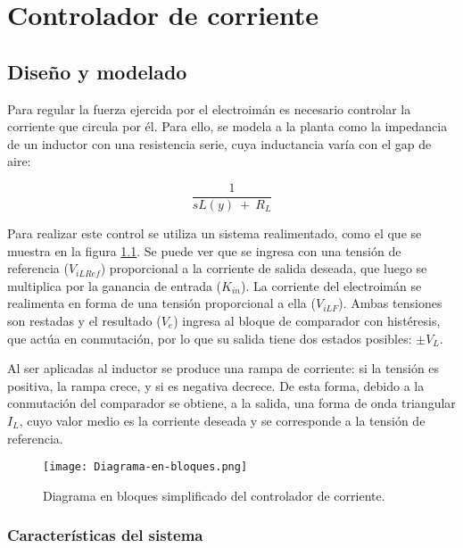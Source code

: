 \chapter{Controlador de corriente}  \label{cap:ControladorCorriente}
\section{Diseño y modelado}

\noindent Para regular la fuerza ejercida por el electroimán es necesario controlar la corriente que circula por él. Para ello, se modela a la planta como la impedancia de un inductor con una resistencia serie, cuya inductancia varía con el gap de aire:

\begin{equation} \label{eq_admitancia}
\frac{1}{sL(y)\ +\ R_L}
\end{equation}

\noindent Para realizar este control se utiliza un sistema realimentado, como el que se muestra en la figura \ref{fig:img_diag-en-bloques}. Se puede ver que se ingresa con una tensión de referencia ($V_{iLRef}$) proporcional a la corriente de salida deseada, que luego se multiplica por la ganancia de entrada ($K_{in}$). La corriente del electroimán se realimenta en forma de una tensión proporcional a ella ($V_{iLF}$). Ambas tensiones son restadas y el resultado ($V_e$) ingresa al bloque de comparador con histéresis, que actúa en conmutación, por lo que su salida tiene dos estados posibles: $\pm$$V_L$.

\noindent Al ser aplicadas al inductor se produce una rampa de corriente: si la tensión es positiva, la rampa crece, y si es negativa decrece. De esta forma, debido a la conmutación del comparador se obtiene, a la salida, una forma de onda triangular $I_L$, cuyo valor medio es la corriente deseada y se corresponde a la tensión de referencia.

\begin{figure}[H]
	\centering
	\texttt{[image: Diagrama-en-bloques.png]}
	\caption{Diagrama en bloques simplificado del controlador de corriente.}
	\label{fig:img_diag-en-bloques}
\end{figure}

\subsection{Características del sistema}

